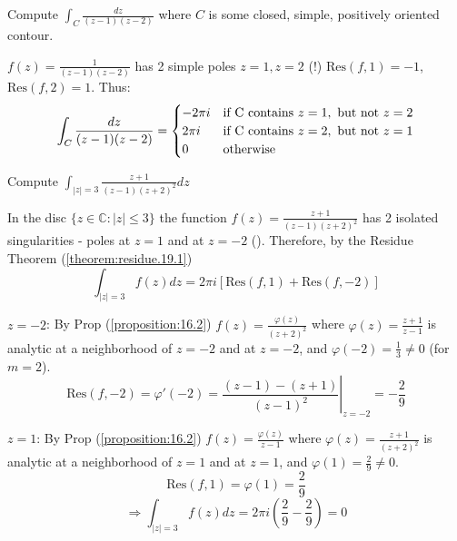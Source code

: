 \begin{example}\label{example:21.6}
    
    Compute $\int_C \frac{dz}{(z-1)(z-2)}$ where $C$ is some closed, simple, positively oriented contour.
\end{example}

\begin{soln}
    
 $f(z) = \frac{1}{(z-1)(z-2)}$ has 2 simple poles $z=1, z=2$ (\verifythis !)
    $\text{Res}(f, 1) = -1$, $\text{Res}(f, 2) = 1$. Thus:
    \[
        \int_C \frac{dz}{(z-1)(z-2)} = \begin{cases}
            -2\pi i & \text{if } $C$ \text{ contains } z=1, \text{ but not } z=2 \\
            2\pi i & \text{if } $C$ \text{ contains } z=2, \text{ but not } z=1 \\
            0 & \text{otherwise}
        \end{cases}
        \]
        
    \end{soln}

\begin{example}\label{example:21.7} Compute $\int_{|z|=3} \frac{z+1}{(z-1)(z+2)^2} dz$
\end{example}

\begin{soln}

     In the disc $\{z \in \mathbb{C}: |z| \le 3\}$ the function $f(z) = \frac{z+1}{(z-1)(z+2)^2}$ has 2 isolated singularities - poles at $z=1$ and at $z=-2$ (\verifythis). Therefore, by the Residue Theorem (\ref{theorem:residue.19.1})
\[
\int_{|z|=3} f(z) dz = 2\pi i \left[ \text{Res}(f, 1) + \text{Res}(f, -2) \right]
\]

$z=-2$: By Prop (\ref{proposition:16.2}) $f(z) = \frac{\varphi(z)}{(z+2)^2}$ where $\varphi(z) = \frac{z+1}{z-1}$ is analytic at a neighborhood of $z=-2$ and at $z=-2$, and $\varphi(-2) = \frac{1}{3} \neq 0$ (for $m=2$).
\[
\text{Res}(f, -2) = \varphi'(-2) = \left. \frac{(z-1) - (z+1)}{(z-1)^2} \right|_{z=-2} = -\frac{2}{9}
\]

$z=1$: By Prop (\ref{proposition:16.2}) $f(z) = \frac{\varphi(z)}{z-1}$ where $\varphi(z) = \frac{z+1}{(z+2)^2}$ is analytic at a neighborhood of $z=1$ and at $z=1$, and $\varphi(1) = \frac{2}{9} \neq 0$.
\[
\text{Res}(f, 1) = \varphi(1) = \frac{2}{9}
\]
\[
\Rightarrow \int_{|z|=3} f(z) dz = 2\pi i \left( \frac{2}{9} - \frac{2}{9} \right) = 0
\]
\end{soln}

